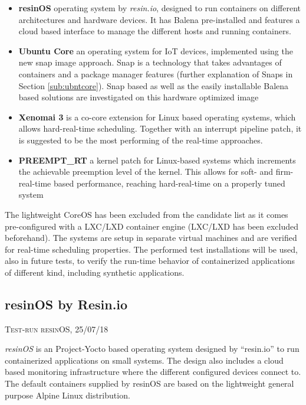 \documentclass[]{scrartcl}
\begin{document}
\begin{itemize}
	\item \textbf{resinOS} operating system by \textit{resin.io}, designed to run containers on different architectures and hardware devices. It has Balena pre-installed and features a cloud based interface to manage the different hosts and running containers.
	\item \textbf{Ubuntu Core} an operating system for IoT devices, implemented using the new snap image approach. Snap is a technology  that takes advantages of containers and a package manager features (further explanation of Snaps in Section \ref{sub:ubntcore}). 
	Snap based as well as the easily installable Balena based solutions are investigated on this hardware optimized image
	\item \textbf{Xenomai 3} is a co-core extension for Linux based operating systems, which allows hard-real-time scheduling. Together with an interrupt pipeline patch, it is suggested to be the most performing of the real-time approaches.
	\item \textbf{PREEMPT\_RT} a kernel patch for Linux-based systems which increments the achievable preemption level of the kernel. This allows for soft- and firm-real-time based performance, reaching hard-real-time on a properly tuned system
\end{itemize}

The lightweight CoreOS has been excluded from the candidate list as it comes pre-configured with a LXC/LXD container engine (LXC/LXD has been excluded beforehand).
The systems are setup in separate virtual machines and are verified for real-time scheduling properties. The performed test installations will be used, also in future tests, to verify the run-time behavior of containerized applications of different kind, including synthetic applications.

\subsection{resinOS by Resin.io}
{\small\textsc{Test-run resinOS, 25/07/18} \bigskip}

\textit{resinOS} is an Project-Yocto based operating system designed by ``resin.io'' to run containerized applications on small systems. The design also includes a cloud based monitoring infrastructure where the different configured devices connect to. The default containers supplied by resinOS are based on the lightweight general purpose Alpine Linux distribution.
\end{document}

